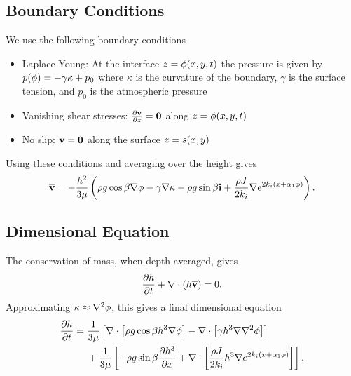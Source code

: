 \subsection{Boundary Conditions}
\begin{frame}
    We use the following boundary conditions 
    \begin{itemize}
        \item Laplace-Young: At the interface $z = \phi\!\left( x, y, t \right)$ the pressure is given by $p\!\left( \phi \right) = -\gamma \kappa + p_0$
        where $\kappa$ is the curvature of the boundary, $\gamma$ is the surface tension, and $p_0$ is the atmospheric pressure
        \item Vanishing shear stresses: $\frac{\partial \textbf{v}}{\partial z} = \textbf{0}$ along $z = \phi\!\left( x, y, t \right)$
        \item No slip: $\textbf{v} = \textbf{0}$ along the surface $z = s\!\left( x, y \right)$
    \end{itemize}

    Using these conditions and averaging over the height gives 
    \begin{equation*}
        \overline{\textbf{v}} = -\frac{h^2}{3\mu} \left( \rho g \cos\beta \nabla \phi - \gamma\nabla\kappa - \rho g \sin\beta\textbf{i} + \frac{\rho J}{2k_i}\nabla e^{2k_i \left( x + \alpha_1 \phi \right)} \right).
    \end{equation*}
\end{frame}
\subsection{Dimensional Equation}
\begin{frame}
    The conservation of mass, when depth-averaged, gives 
    \begin{equation*}\frac{\partial h}{\partial t} + \nabla \cdot \left( h\overline{\textbf{v}} \right) = 0.\end{equation*}
    Approximating $\kappa \approx \nabla^2 \phi$, this gives a final dimensional equation 
    \begin{equation}
        \begin{aligned}
            \frac{\partial h}{\partial t} = \; &\frac{1}{3\mu} \left[  \nabla \cdot \left[ \rho g \cos \beta h^3 \nabla \phi \right] - \nabla \cdot \left[ \gamma h^3 \nabla\nabla^2\phi \right] \right] \\ 
            &+ \frac{1}{3\mu} \left[ - \rho g \sin\beta \frac{\partial h^3}{\partial x} + \nabla \cdot \left[ \frac{\rho J}{2k_i}h^3\nabla e^{2k_i \left( x + \alpha_1 \phi \right)} \right] \right].
        \end{aligned}
        \label{eq:thin_film_dim}
    \end{equation}
\end{frame}

